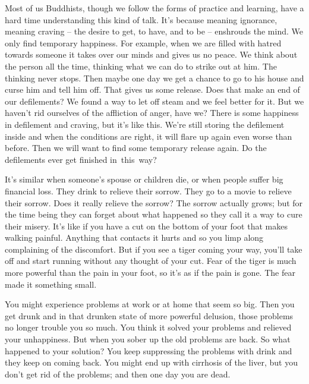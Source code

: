 Most of us Buddhists, though we follow the forms of practice and \mbox{learning,} have a hard time understanding this kind of talk. It's because  meaning ignorance, meaning craving -- the desire to get, to have, and to be -- enshrouds the mind. We only find temporary happiness. For example, when we are filled with hatred towards someone it takes over our minds and gives us no peace. We think about the person all the time, thinking what we can do to strike out at him. The thinking never stops. Then maybe one day we get a chance to go to his house and curse him and tell him off. That gives us some release. Does that make an end of our defilements? We found a way to let off steam and we feel better for it. But we haven't rid ourselves of the affliction of anger, have we? There is some happiness in defilement and craving, but it's like this. We're still storing the defilement inside and when the conditions are right, it will flare up again even worse than before. Then we will want to find some temporary release again. Do the defilements ever get finished \mbox{in this way?}

It's similar when someone's spouse or children die, or when people suffer big financial loss. They drink to relieve their sorrow. They go to a movie to relieve their sorrow. Does it really relieve the sorrow? The sorrow actually grows; but for the time being they can forget about what happened so they call it a way to cure their misery. It's like if you have a cut on the bottom of your foot that makes walking painful. Anything that contacts it hurts and so you limp along complaining of the discomfort. But if you see a tiger coming your way, you'll take off and start running without any thought of your cut. Fear of the tiger is much more powerful than the pain in your foot, so it's as if the pain is gone. The fear made it something small.

You might experience problems at work or at home that seem so big. Then you get drunk and in that drunken state of more powerful delusion, those problems no longer trouble you so much. You think it solved your problems and relieved your unhappiness. But when you sober up the old problems are back. So what happened to your solution? You keep suppressing the problems with drink and they keep on coming back. You might end up with cirrhosis of the liver, but you don't get rid of the problems; and then one day you are dead.


